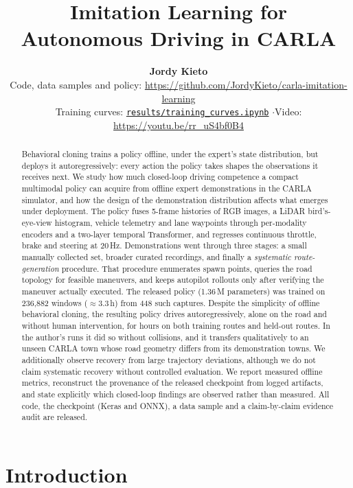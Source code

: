 \documentclass[11pt]{article}
\title{\LARGE\bfseries Imitation Learning for Autonomous Driving in CARLA}
\author{%
  \textbf{Jordy Kieto}\\[4pt]
  \small Code, data samples and policy: \url{https://github.com/JordyKieto/carla-imitation-learning}\\
  \small Training curves: \href{https://github.com/JordyKieto/carla-imitation-learning/blob/main/results/training_curves.ipynb}{\texttt{results/training\_curves.ipynb}}
  \quad$\cdot$\quad Video: \url{https://youtu.be/rr_uS4bf0B4}
}
\date{}
\begin{document}
\maketitle
\thispagestyle{firstpage}

\begin{abstract}
\noindent Behavioral cloning trains a policy offline, under the expert's state distribution, but deploys it autoregressively: every action the policy takes shapes the observations it receives next. We study how much closed-loop driving competence a compact multimodal policy can acquire from offline expert demonstrations in the CARLA simulator, and how the design of the demonstration distribution affects what emerges under deployment. The policy fuses 5-frame histories of RGB images, a LiDAR bird's-eye-view histogram, vehicle telemetry and lane waypoints through per-modality encoders and a two-layer temporal Transformer, and regresses continuous throttle, brake and steering at 20\,Hz. Demonstrations went through three stages: a small manually collected set, broader curated recordings, and finally a \emph{systematic route-generation} procedure. That procedure enumerates spawn points, queries the road topology for feasible maneuvers, and keeps autopilot rollouts only after verifying the maneuver actually executed. The released policy (1.36\,M parameters) was trained on 236,882 windows ($\approx$3.3\,h) from 448 such captures. Despite the simplicity of offline behavioral cloning, the resulting policy drives autoregressively, alone on the road and without human intervention, for hours on both training routes and held-out routes. In the author's runs it did so without collisions, and it transfers qualitatively to an unseen CARLA town whose road geometry differs from its demonstration towns. We additionally observe recovery from large trajectory deviations, although we do not claim systematic recovery without controlled evaluation. We report measured offline metrics, reconstruct the provenance of the released checkpoint from logged artifacts, and state explicitly which closed-loop findings are observed rather than measured. All code, the checkpoint (Keras and ONNX), a data sample and a claim-by-claim evidence audit are released.
\end{abstract}

\section{Introduction}
\end{document}
